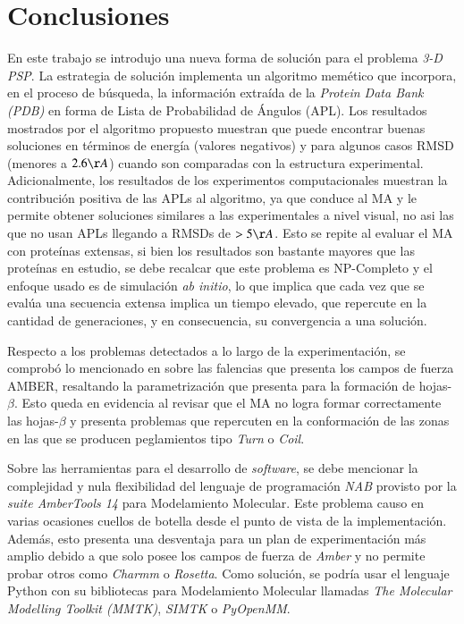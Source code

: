 \chapter{Conclusiones}

En este trabajo se introdujo una nueva forma de solución para el problema \textit{3-D PSP}. La estrategia de solución implementa un algoritmo memético que incorpora, en el proceso de búsqueda, la información extraída de la \textit{Protein Data Bank (PDB)} en forma de Lista de Probabilidad de Ángulos (APL). Los resultados mostrados por el algoritmo propuesto muestran que puede encontrar buenas soluciones en términos de energía (valores negativos) y para algunos casos RMSD (menores a $2.6\AA$) cuando son comparadas con la estructura experimental. Adicionalmente, los resultados de los experimentos computacionales muestran la contribución positiva de las APLs al algoritmo, ya que conduce al MA y le permite obtener soluciones similares a las experimentales a nivel visual, no asi las que no usan APLs llegando a RMSDs de $>5\AA$. Esto se repite al evaluar el MA con proteínas extensas, si bien los resultados son bastante mayores que las proteínas en estudio, se debe recalcar que este problema es NP-Completo y el enfoque usado es de simulación \textit{ab initio}, lo que implica que cada vez que se evalúa una secuencia extensa implica un tiempo elevado, que repercute en la cantidad de generaciones, y en consecuencia, su convergencia a una solución.

Respecto a los problemas detectados a lo largo de la experimentación, se comprobó lo mencionado en \citealp{hornak:2006} sobre las falencias que presenta los campos de fuerza AMBER, resaltando la parametrización que presenta para la formación de hojas-$\beta$. Esto queda en evidencia al revisar que el MA no logra formar correctamente las hojas-$\beta$ y presenta problemas que repercuten en la conformación de las zonas en las que se producen peglamientos tipo \textit{Turn} o \textit{Coil}.

Sobre las herramientas para el desarrollo de \textit{software}, se debe mencionar la complejidad y nula flexibilidad del lenguaje de programación \textit{NAB} provisto por la \textit{suite AmberTools 14} para Modelamiento Molecular. Este problema causo en varias ocasiones cuellos de botella desde el punto de vista de la implementación. Además, esto presenta una desventaja para un plan de experimentación más amplio debido a que solo posee los campos de fuerza de \textit{Amber} y no permite probar otros como \textit{Charmm} o \textit{Rosetta}. Como solución, se podría usar el lenguaje Python con su bibliotecas para Modelamiento Molecular llamadas \textit{The Molecular Modelling Toolkit (MMTK)}, \textit{SIMTK} o \textit{PyOpenMM}.

